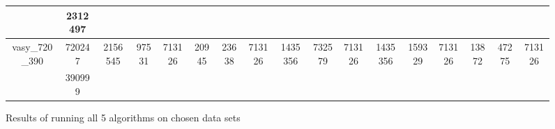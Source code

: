 \documentclass[../master/master.tex]{subfiles}
\begin{document}
\begin{figure}
\begin{adjustbox}{angle=90}
\begin{tabular}{ |c|c||c|c|c||c|c|c||c|c|c||c|c|c||c|c|c|| }
\cline{2-2}
 & 2312497  &  &  &  &  &  &  &  &  &  &  &  &  &  &  &  \\
\hline
\multirow{2}{3.6em}{vasy\_720\_390} & 720247 & \multirow{2}{3.6em}{2156545} & \multirow{2}{3.6em}{97531} & \multirow{2}{3.6em}{713126} & \multirow{2}{3.6em}{20945} & \multirow{2}{3.6em}{23638} & \multirow{2}{3.6em}{713126} & \multirow{2}{3.6em}{1435356} & \multirow{2}{3.6em}{732579} & \multirow{2}{3.6em}{713126} & \multirow{2}{3.6em}{1435356} & \multirow{2}{3.6em}{159329} & \multirow{2}{3.6em}{713126} & \multirow{2}{3.6em}{13872} & \multirow{2}{3.6em}{47275} & \multirow{2}{3.6em}{713126} \\
\cline{2-2}
 & 390999  &  &  &  &  &  &  &  &  &  &  &  &  &  &  &  \\
\hline
\end{tabular}
\end{adjustbox}
\caption{Results of running all 5 algorithms on chosen data sets}
\label{fig:data}
\end{figure}
\end{document}

